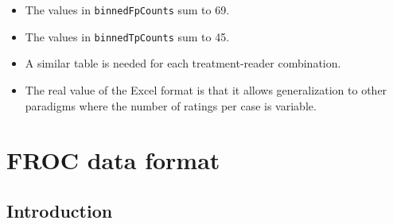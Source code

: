 \documentclass[]{book}
\newenvironment{Shaded}{\begin{snugshade}}{\end{snugshade}}
\newcommand{\CommentTok}[1]{\textcolor[rgb]{0.56,0.35,0.01}{\textit{#1}}}
\newcommand{\ControlFlowTok}[1]{\textcolor[rgb]{0.13,0.29,0.53}{\textbf{#1}}}
\newcommand{\DecValTok}[1]{\textcolor[rgb]{0.00,0.00,0.81}{#1}}
\newcommand{\KeywordTok}[1]{\textcolor[rgb]{0.13,0.29,0.53}{\textbf{#1}}}
\newcommand{\NormalTok}[1]{#1}
\newcommand{\OperatorTok}[1]{\textcolor[rgb]{0.81,0.36,0.00}{\textbf{#1}}}
\newcommand{\StringTok}[1]{\textcolor[rgb]{0.31,0.60,0.02}{#1}}
\providecommand{\tightlist}{%
  \setlength{\itemsep}{0pt}\setlength{\parskip}{0pt}}
\begin{document}
\begin{Shaded}
\end{Shaded}

\begin{itemize}
\tightlist
\item
  The values in \texttt{binnedFpCounts} sum to 69.
\item
  The values in \texttt{binnedTpCounts} sum to 45.
\item
  A similar table is needed for each treatment-reader combination.
\item
  The real value of the Excel format is that it allows generalization to other paradigms where the number of ratings per case is variable.
\end{itemize}

\hypertarget{frocdataformat}{%
\chapter{FROC data format}\label{frocdataformat}}

\hypertarget{introduction-1}{%
\section{Introduction}\label{introduction-1}}
\end{document}
